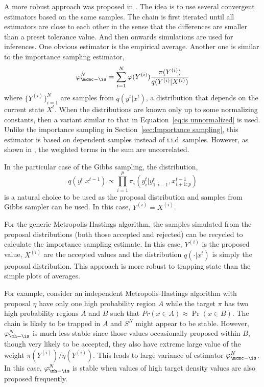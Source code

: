 

A more robust approach was proposed in \cite{Robert:1995ge}. The idea is to
use several convergent estimators based on the same samples. The chain is
first iterated until all estimators are close to each other in the sense that
the differences are smaller than a preset tolerance value. And then onwards
simulations are used for inferences. One obvious estimator is the empirical
average. Another one is similar to the importance sampling estimator,
\begin{equation}
  \varphi_{\mcmc-\is}^N
  = \sum_{i=1}^N \varphi(Y^{(i)})\frac{\pi(Y^{(i)})}{q(Y^{(i)}|X^{(i)})}
  \label{eq:sn is}
\end{equation}
where $\{Y^{(i)}\}_{i=1}^N$ are samples from $q(y^t|x^t)$, a distribution
that depends on the current state $X^t$. When the distributions are known
only up to some normalizing constants, then a variant similar to that in
Equation~\eqref{eq:is unnormalized} is used. Unlike the importance sampling
in Section~\ref{sec:Importance sampling}, this estimator is based on
dependent samples instead of i.i.d\ samples. However, as shown in
\cite[][Lemma~12.11]{Robert:2004tn}, the weighted terms in the sum are
uncorrelated.

In the particular case of the Gibbs sampling, the distribution,
\begin{equation}
  q(y^t|x^{t-1}) \propto
  \prod_{i=1}^p \pi_i(y_i^t|y_{1:i-1}^t,x_{i+1:p}^{t-1})
\end{equation}
is a natural choice to be used as the proposal distribution and samples from
Gibbs sampler can be used. In this case, $Y^{(i)} = X^{(i)}$.

For the generic Metropolis-Hastings algorithm, the samples simulated from the
proposal distributions (both those accepted and rejected) can be recycled to
calculate the importance sampling estimate. In this case, $Y^{(i)}$ is the
proposed value, $X^{(i)}$ are the accepted values and the distribution
$q(\cdot|x^t)$ is simply the proposal distribution. This approach is more
robust to trapping state than the simple plots of averages.

For example, consider an independent Metropolis-Hastings algorithm with
proposal $\eta$ have only one high probability region $A$ while the target
$\pi$ has two high probability regions $A$ and $B$ such that $Pr(x\in
A)\approx\Pr(x\in B)$. The chain is likely to be trapped in $A$ and $S^N$
might appear to be stable. However, $\varphi_{\mh-\is}^N$ is much less stable
since those values occasionally proposed within $B$, though very likely to be
accepted, they also have extreme large value of the weight
$\pi(Y^{(i)})/\eta(Y^{(i)})$. This leads to large variance of estimator
$\varphi_{\mcmc-\is}^N$. In this case, $\varphi_{\mh-\is}^N$ is stable when
values of high target density values are also proposed frequently.

